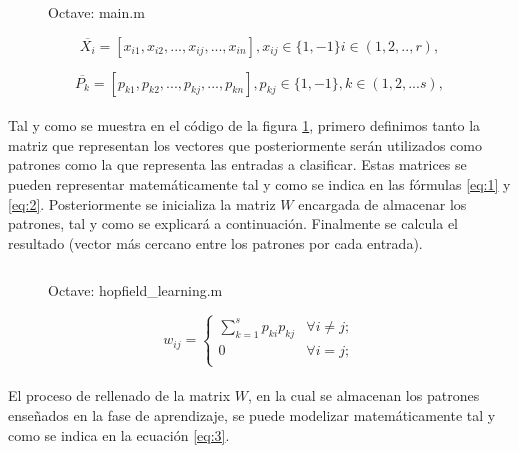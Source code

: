 \documentclass[10pt, a4paper,spanish]{article}
\begin{document}
		\begin{figure}[htpb!]
			\centering
			\inputminted{octave}{../src/main.m}
			\caption{Octave: main.m}
			\label{code:main}
		\end{figure}

		\begin{equation} \label{eq:1}
			\overline{X_{i}} = [x_{i1}, x_{i2}, ..., x_{ij}, ..., x_{in}], x_{ij} \in \{1,-1\} i \in (1,2,.., r),
		\end{equation}

		\begin{equation} \label{eq:2}
			\overline{P_{k}} = [p_{k1}, p_{k2}, ..., p_{kj}, ..., p_{kn}], p_{kj} \in \{1,-1\}, k \in (1,2,...s),
		\end{equation}

		\paragraph{}
		Tal y como se muestra en el código de la figura \ref{code:main}, primero definimos tanto la matriz que representan los  vectores que posteriormente serán utilizados como patrones como la que representa las entradas a clasificar. Estas matrices se pueden representar matemáticamente tal y como se indica en las fórmulas \ref{eq:1} y \ref{eq:2}.  Posteriormente se inicializa la matriz $W$ encargada de almacenar los patrones, tal y como se explicará a continuación. Finalmente se calcula el resultado (vector más cercano entre los patrones por cada entrada).

		\begin{figure}[htpb!]
			\centering
			\inputminted{octave}{../src/hopfield_learning.m}
			\caption{Octave: hopfield\_learning.m}
			\label{code:learning}
		\end{figure}

		\begin{equation} \label{eq:3}
			w_{ij} =
			\begin{cases}
				\sum_{k=1}^{s} p_{ki}p_{kj} 	& \forall i \neq j; 	\\
				0															& \forall i = j; 		\\
			\end{cases}
		\end{equation}

		\paragraph{}
		El proceso de rellenado de la matrix $W$, en la cual se almacenan los patrones enseñados en la fase de aprendizaje, se puede modelizar matemáticamente tal y como se indica en la ecuación \ref{eq:3}.
\end{document}
